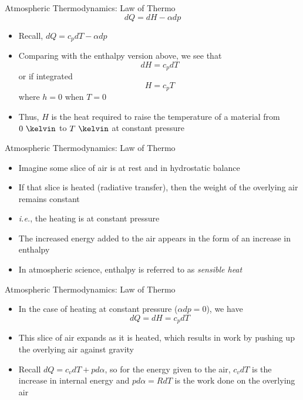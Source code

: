 \begin{frame}{Atmospheric Thermodynamics:  Law of Thermo}
$$dQ = dH - \alpha dp$$
\begin{itemize}
	\item Recall, $dQ = c_pdT - \alpha dp$
	\item Comparing with the enthalpy version above, we see that
	$$dH = c_pdT$$
	or if integrated
	$$H=c_pT$$
	where $h=0$ when $T=0$
	\item Thus, $H$ is the heat required to raise the temperature of a material from $0\ \kelvin$ to $T\ \kelvin$ at constant pressure
\end{itemize}
\end{frame}
\begin{frame}{Atmospheric Thermodynamics:  Law of Thermo}
\begin{itemize}
	\item Imagine some slice of air is at rest and in hydrostatic balance
	\item If that slice is heated (radiative transfer), then the weight of the overlying air remains constant
	\item \textit{i.e.}, the heating is at constant pressure
	\item The increased energy added to the air appears in the form of an increase in enthalpy
	\item In atmospheric science, enthalpy is referred to as \textit{sensible heat}
\end{itemize}
\end{frame}
\begin{frame}{Atmospheric Thermodynamics:  Law of Thermo}
\begin{itemize}
	\item In the case of heating at constant pressure ($\alpha dp=0$), we have
	$$dQ = dH = c_pdT$$
	\item This slice of air expands as it is heated, which results in work by pushing up the overlying air against gravity
	\item Recall $dQ = c_vdT + pd\alpha$, so for the energy given to the air, $c_vdT$ is the increase in internal energy and $pd\alpha=RdT$ is the work done on the overlying air
\end{itemize}
\end{frame}
